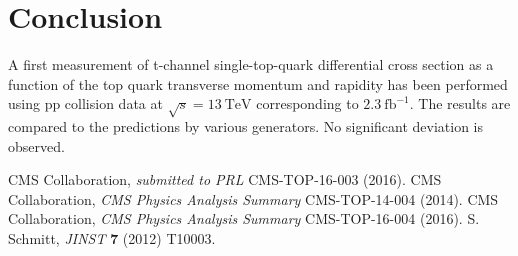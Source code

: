 \documentclass[12pt]{article}
\begin{document}
\section{Conclusion}

A first measurement of t-channel single-top-quark differential cross section as a function of the top quark transverse momentum and rapidity has been performed using pp collision data at $\sqrt{s}=13~\mathrm{TeV}$ corresponding to $2.3~\mathrm{fb}^{-1}$. The results are compared to the predictions by various generators. No significant deviation is observed.

\begin{thebibliography}{99}

 CMS Collaboration, \emph{submitted to PRL} CMS-TOP-16-003 (2016).
 CMS Collaboration, \emph{CMS Physics Analysis Summary} CMS-TOP-14-004 (2014).
 CMS Collaboration, \emph{CMS Physics Analysis Summary} CMS-TOP-16-004 (2016).
 S. Schmitt, \emph{JINST} \textbf{7} (2012) T10003.

\end{thebibliography}

 
\end{document}
